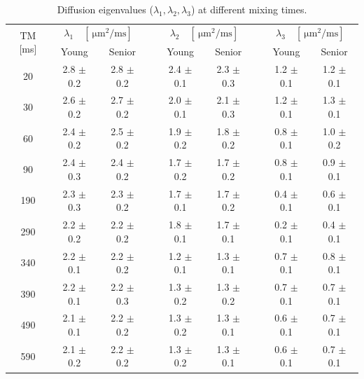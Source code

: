 \begin{table}[!htb]
\vspace{+0.2cm}
\begin{center}
\caption[Diffusion eigenvalues at different mixing times]{Diffusion eigenvalues ($\lambda_1, \lambda_2, \lambda_3$) at different mixing times.}
\label{tab:RPBM}
\begin{tabular}{@{}ccccccccc@{}}
\toprule[1pt]\midrule[0.3pt]
\multirow{2}{*}{$\mathrm{TM}$ {[}ms{]}} & \multicolumn{2}{c}{$\lambda_1 \quad [\SI{}{\micro\meter^2\per\milli\second}]$}  &  & \multicolumn{2}{c}{$\lambda_2 \quad [\SI{}{\micro\meter^2\per\milli\second}]$}  &  & \multicolumn{2}{c}{$\lambda_3 \quad [\SI{}{\micro\meter^2\per\milli\second}]$}  \\ \cmidrule(lr){2-3} \cmidrule(lr){5-6} \cmidrule(lr){8-9} 
                             & Young     & Senior    &  & Young     & Senior    &  & Young     & Senior    \\ \cmidrule(){1-9}
20                           & 2.8 $\pm$ 0.2 & 2.8 $\pm$ 0.2 &  & 2.4 $\pm$ 0.1 & 2.3 $\pm$ 0.3 &  & 1.2 $\pm$ 0.1 & 1.2 $\pm$ 0.1 \\
30                           & 2.6 $\pm$ 0.2 & 2.7 $\pm$ 0.2 &  & 2.0 $\pm$ 0.1 & 2.1 $\pm$ 0.3 &  & 1.2 $\pm$ 0.1 & 1.3 $\pm$ 0.1 \\
60                           & 2.4 $\pm$ 0.2 & 2.5 $\pm$ 0.2 &  & 1.9 $\pm$ 0.2 & 1.8 $\pm$ 0.2 &  & 0.8 $\pm$ 0.1 & 1.0 $\pm$ 0.2 \\
90                           & 2.4 $\pm$ 0.3 & 2.4 $\pm$ 0.2 &  & 1.7 $\pm$ 0.2 & 1.7 $\pm$ 0.2 &  & 0.8 $\pm$ 0.1 & 0.9 $\pm$ 0.1 \\
190                          & 2.3 $\pm$ 0.3 & 2.3 $\pm$ 0.2 &  & 1.7 $\pm$ 0.1 & 1.7 $\pm$ 0.2 &  & 0.4 $\pm$ 0.1 & 0.6 $\pm$ 0.1 \\
290                          & 2.2 $\pm$ 0.2 & 2.2 $\pm$ 0.2 &  & 1.8 $\pm$ 0.1 & 1.7 $\pm$ 0.1 &  & 0.2 $\pm$ 0.1 & 0.4 $\pm$ 0.1 \\
340                          & 2.2 $\pm$ 0.1 & 2.2 $\pm$ 0.2 &  & 1.2 $\pm$ 0.1 & 1.3 $\pm$ 0.1 &  & 0.7 $\pm$ 0.1 & 0.8 $\pm$ 0.1 \\
390                          & 2.2 $\pm$ 0.1 & 2.2 $\pm$ 0.3 &  & 1.3 $\pm$ 0.2 & 1.3 $\pm$ 0.2 &  & 0.7 $\pm$ 0.1 & 0.7 $\pm$ 0.1 \\
490                          & 2.1 $\pm$ 0.1 & 2.2 $\pm$ 0.2 &  & 1.3 $\pm$ 0.2 & 1.3 $\pm$ 0.1 &  & 0.6 $\pm$ 0.1 & 0.7 $\pm$ 0.1 \\
590                          & 2.1 $\pm$ 0.2 & 2.2 $\pm$ 0.2 &  & 1.3 $\pm$ 0.2 & 1.3 $\pm$ 0.1 &  & 0.6 $\pm$ 0.1 & 0.7 $\pm$ 0.1 \\ \midrule[0.3pt]\bottomrule[1pt]
\end{tabular}
\end{center}
\vspace{-0.2cm}
\end{table}
